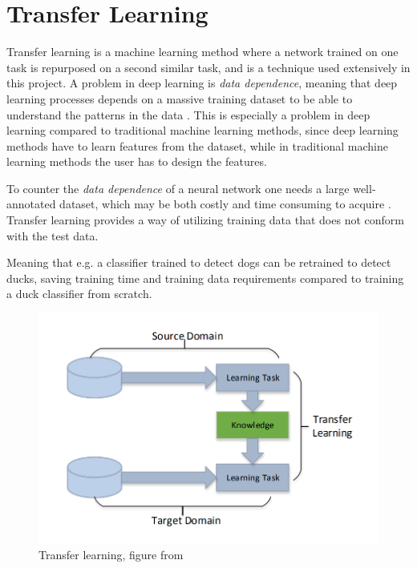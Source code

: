 \section{Transfer Learning}
Transfer learning is a machine learning method where a network trained on one task is repurposed on a second similar task, and is a technique used extensively in this project. A problem in deep learning is \textit{data dependence}, meaning that deep learning processes depends on a massive training dataset to be able to understand the patterns in the data \citep{TransferLearning2}. This is especially a problem in deep learning compared to traditional machine learning methods, since deep learning methods have to learn features from the dataset, while in traditional machine learning methods the user has to design the features. 

\vspace{3mm}

To counter the \textit{data dependence} of a neural network one needs a large well-annotated dataset, which may be both costly and time consuming to acquire \citep{TransferLearning}. Transfer learning provides a way of utilizing training data that does not conform with the test data. 


Meaning that e.g. a classifier trained to detect dogs can be retrained to detect ducks, saving training time and training data requirements compared to training a duck classifier from scratch. 



\begin{figure}[h!]
    \centering
    \includegraphics[scale=0.4]{fig/transfer_learning.png}
    \caption{Transfer learning, figure from \citep{TransferLearning2}}
    \label{fig:transfer_learning}
\end{figure}

